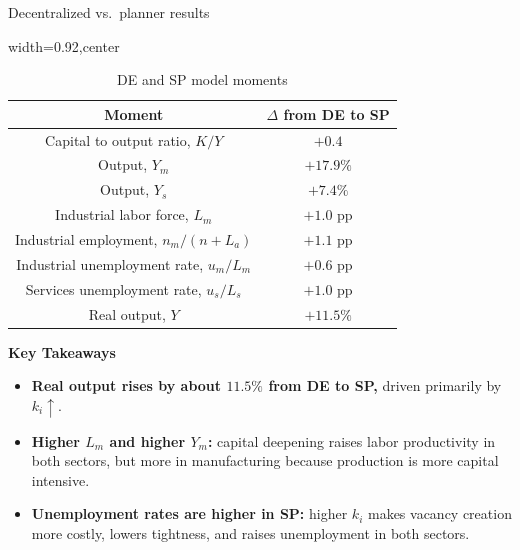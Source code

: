\documentclass[9pt,xcolor={svgnames}]{beamer}
\begin{document}
\begin{frame}{Decentralized vs.\ planner results}

\begin{table}[h!]
\centering
\caption{DE and SP model moments}
\begin{adjustbox}{width=0.92\columnwidth,center}
\begin{tabular}{||c c||}
\hline
\textbf{Moment} & \textbf{$\Delta$ from DE to SP} \\
\hline\hline
Capital to output ratio, $K/Y$ & $+0.4$ \\
Output, $Y_m$ & $+17.9\%$ \\
Output, $Y_s$ & $+7.4\%$ \\
Industrial labor force, $L_m$ & $+1.0$ pp \\
Industrial employment, $n_m/(n+L_a)$ & $+1.1$ pp \\
Industrial unemployment rate, $u_m/L_m$ & $+0.6$ pp \\
Services unemployment rate, $u_s/L_s$ & $+1.0$ pp \\
Real output, $Y$ & $+11.5\%$ \\
\hline
\end{tabular}
\end{adjustbox}
\end{table}

\textbf{Key Takeaways}
\begin{itemize}
  \item \textbf{Real output rises by about $11.5\%$ from DE to SP,} driven primarily by $k_i \uparrow$.
  \medskip
  \item \textbf{Higher $L_m$ and higher $Y_m$:} capital deepening raises labor productivity in both sectors, but more in manufacturing because production is more capital intensive.
  \medskip
  \item \textbf{Unemployment rates are higher in SP:} higher $k_i$ makes vacancy creation more costly, lowers tightness, and raises unemployment in both sectors.
\end{itemize}

\end{frame}



\end{document}
